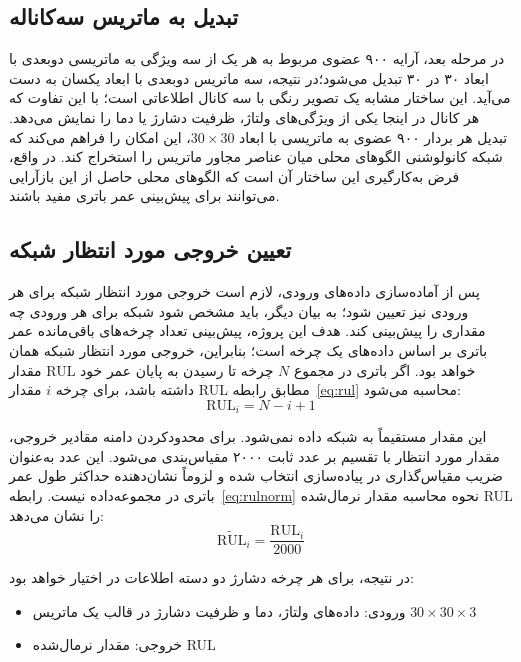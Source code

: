 \subsection{تبدیل به ماتریس سه‌کاناله}

در مرحله بعد، آرایه ۹۰۰ عضوی مربوط به هر یک از سه ویژگی به ماتریسی دوبعدی با ابعاد ۳۰ در ۳۰ تبدیل می‌شود؛در نتیجه، سه ماتریس دوبعدی با ابعاد یکسان به دست می‌آید. این ساختار مشابه یک تصویر رنگی با سه کانال اطلاعاتی است؛ با این تفاوت که هر کانال در اینجا یکی از ویژگی‌های ولتاژ، ظرفیت دشارژ یا دما را نمایش می‌دهد. تبدیل هر بردار ۹۰۰ عضوی به ماتریسی با ابعاد \(30\times30\)، این امکان را فراهم می‌کند که شبکه کانولوشنی الگوهای محلی میان عناصر مجاور ماتریس را استخراج کند. در واقع، فرض به‌کارگیری این ساختار آن است که الگوهای محلی حاصل از این بازآرایی می‌توانند برای پیش‌بینی عمر باتری مفید باشند.

\subsection{تعیین خروجی مورد انتظار شبکه}
\label{sec:target}

پس از آماده‌سازی داده‌های ورودی، لازم است خروجی مورد انتظار شبکه برای هر ورودی نیز تعیین شود؛ به بیان دیگر، باید مشخص شود شبکه برای هر ورودی چه مقداری را پیش‌بینی کند. هدف این پروژه، پیش‌بینی تعداد چرخه‌های باقی‌مانده عمر باتری بر اساس داده‌های یک چرخه است؛ بنابراین، خروجی مورد انتظار شبکه همان مقدار RUL خواهد بود. اگر باتری در مجموع $N$ چرخه تا رسیدن به پایان عمر خود داشته باشد، برای چرخه $i$ مقدار RUL مطابق رابطه~\eqref{eq:rul} محاسبه می‌شود:
\begin{equation}
\mathrm{RUL}_i = N - i + 1
\label{eq:rul}
\end{equation}

این مقدار مستقیماً به شبکه داده نمی‌شود. برای محدودکردن دامنه مقادیر خروجی، مقدار مورد انتظار با تقسیم بر عدد ثابت ۲۰۰۰ مقیاس‌بندی می‌شود. این عدد به‌عنوان ضریب مقیاس‌گذاری در پیاده‌سازی انتخاب شده و لزوماً نشان‌دهنده حداکثر طول عمر باتری در مجموعه‌داده نیست. رابطه~\eqref{eq:rulnorm} نحوه محاسبه مقدار نرمال‌شده RUL را نشان می‌دهد:
\begin{equation}
\widetilde{\mathrm{RUL}}_i = \frac{\mathrm{RUL}_i}{2000}
\label{eq:rulnorm}
\end{equation}

در نتیجه، برای هر چرخه دشارژ دو دسته اطلاعات در اختیار خواهد بود:
\begin{itemize}
\item ورودی: داده‌های ولتاژ، دما و ظرفیت دشارژ در قالب یک ماتریس $30 \times 30 \times 3$
\item خروجی: مقدار نرمال‌شده RUL
\end{itemize}

